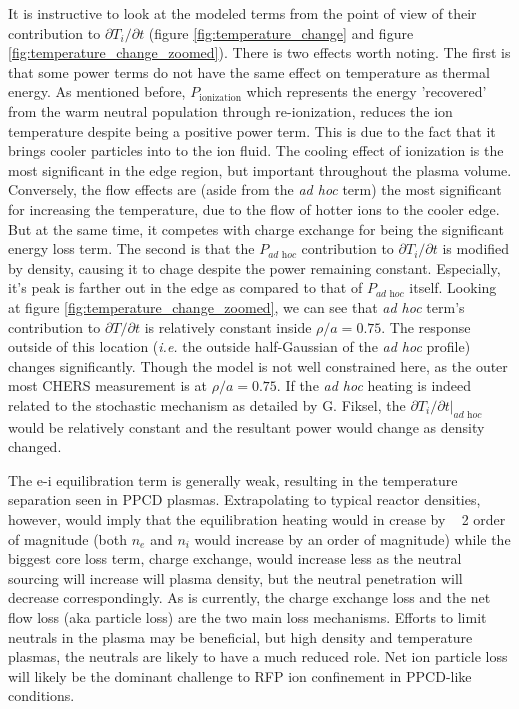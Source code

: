 It is instructive to look at the modeled terms from the point of view of their contribution to $\partial T_i /\partial t$ (figure \ref{fig:temperature_change} and figure \ref{fig:temperature_change_zoomed}). There is two effects worth noting. The first is that some power terms do not have the same effect on temperature as thermal energy. As mentioned before, $P_{\textrm{ionization}}$ which represents the energy 'recovered' from the warm neutral population through re-ionization, reduces the ion temperature despite being a positive power term. This is due to the fact that it brings cooler particles into to the ion fluid. The cooling effect of ionization is the most significant in the edge region, but important throughout the plasma volume. Conversely, the flow effects are (aside from the \textit{ad hoc} term) the most significant for increasing the temperature, due to the flow of hotter ions to the cooler edge. But at the same time, it competes with charge exchange for being the significant energy loss term. The second is that the $P_{\textit{ad hoc}}$ contribution to $\partial T_i / \partial t$ is modified by density, causing it to chage despite the power remaining constant. Especially, it's peak is farther out in the edge as compared to that of $P_{\textit{ad hoc}}$ itself. Looking at figure \ref{fig:temperature_change_zoomed}, we can see that \textit{ad hoc} term's contribution to $\partial T/\partial t$ is relatively constant inside $\rho/a = 0.75$. The response outside of this location (\textit{i.e.} the outside half-Gaussian of the \textit{ad hoc} profile) changes significantly. Though the model is not well constrained here, as the outer most CHERS measurement is at $\rho/a = 0.75$. If the \textit{ad hoc} heating is indeed related to the stochastic mechanism as detailed by G. Fiksel, the $\left.\partial T_{i}/\partial t\right|_{\textit{ad hoc}}$ would be relatively constant and the resultant power would change as density changed. 

The e-i equilibration term is generally weak, resulting in the temperature separation seen in PPCD plasmas. Extrapolating to typical reactor densities, however, would imply that the equilibration heating would in crease by ~ 2 order of magnitude (both $n_e$ and $n_i$ would increase by an order of magnitude) while the biggest core loss term, charge exchange, would increase less as the neutral sourcing will increase will plasma density, but the neutral penetration will decrease correspondingly. As is currently, the charge exchange loss and the net flow loss (aka particle loss) are the two main loss mechanisms. Efforts to limit neutrals in the plasma may be beneficial, but high density and temperature plasmas, the neutrals are likely to have a much reduced role. Net ion particle loss will likely be the dominant challenge to RFP ion confinement in PPCD-like conditions. 

